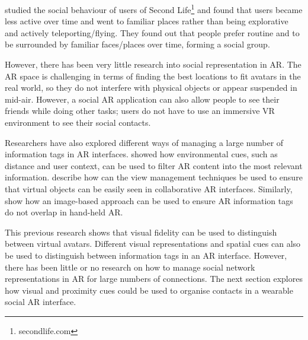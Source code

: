 \textcite{Harris2009} studied the social behaviour of users of Second Life\footnote{secondlife.com} and found that users became less active over time and went to familiar places rather than being explorative and actively teleporting/flying. They found out that people prefer routine and to be surrounded by familiar faces/places over time, forming a social group.

However, there has been very little research into social representation in AR. The AR space is challenging in terms of finding the best locations to fit avatars in the real world, so they do not interfere with physical objects or appear suspended in mid-air. However, a social AR application can also allow people to see their friends while doing other tasks; users do not have to use an immersive VR environment to see their social contacts.

Researchers have also explored different ways of managing a large number of information tags in AR interfaces. \textcite{Julier2002} showed how environmental cues, such as distance and user context, can be used to filter AR content into the most relevant information. \textcite{Hollerer2001} describe how can the view management techniques be used to ensure that virtual objects can be easily seen in collaborative AR interfaces. Similarly, \textcite{Grasset2012} show how an image-based approach can be used to ensure AR information tags do not overlap in hand-held AR. 

This previous research shows that visual fidelity can be used to distinguish between virtual avatars. Different visual representations and spatial cues can also be used to distinguish between information tags in an AR interface. However, there has been little or no research on how to manage social network representations in AR for large numbers of connections. The next section explores how visual and proximity cues could be used to organise contacts in a wearable social AR interface.



